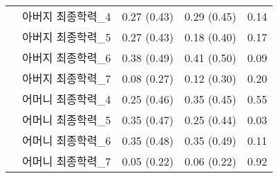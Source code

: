 \begin{table}[ph]
{\begin{tabular}{cc|cc|c}
                                                                                                   & 아버지 최종학력\_4  & 0.27 (0.43)              & 0.29 (0.45)               & 0.14                                          \\
                                                                                                   & 아버지 최종학력\_5  & 0.27 (0.43)          & 0.18 (0.40)           & 0.17                                       \\
                                                                                                   & 아버지 최종학력\_6  & 0.38 (0.49)          & 0.41 (0.50)           & 0.09                                       \\
                                                                                                   & 아버지 최종학력\_7  & 0.08 (0.27)          & 0.12 (0.30)           & 0.20                                       \\
                                                                                                   & 어머니 최종학력\_4  & 0.25 (0.46)              & 0.35 (0.45)               & 0.55                                          \\
                                                                                                   & 어머니 최종학력\_5  & 0.35 (0.47)          & 0.25 (0.44)           & 0.03                                       \\
                                                                                                   & 어머니 최종학력\_6  & 0.35 (0.48)          & 0.35 (0.49)           & 0.11                                       \\
                                                                                                   & 어머니 최종학력\_7  & 0.05 (0.22)          & 0.06 (0.22)           & 0.92                                       \\ \hline
\end{tabular}}
\end{table}

